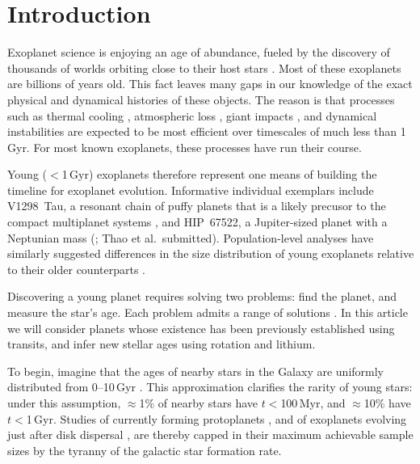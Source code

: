 \documentclass[11pt,twocolumn,tighten]{aastex63}
\begin{document}

\section{Introduction}
\label{sec:intro}

Exoplanet science is enjoying an age of abundance, fueled by the
discovery of thousands of worlds orbiting close to their host stars
\citep{Borucki10,2015JATIS...1a4003R}.  Most of these exoplanets are
billions of years old.  This fact leaves many gaps in our knowledge of
the exact physical and dynamical histories of these objects.  The
reason is that processes such as thermal cooling
\citep{2007ApJ...659.1661F}, atmospheric loss
\citep{2019AREPS..47...67O}, giant impacts
\citep{2014prpl.conf..595R}, and dynamical instabilities
\citep{2017MNRAS.470.1750I} are expected to be most efficient over
timescales of much less than 1\,Gyr.  For most known exoplanets, these
processes have run their course.

Young ($<$1\,Gyr) exoplanets therefore represent one means of building
the timeline for exoplanet evolution.  Informative individual
exemplars include V1298~Tau, a resonant chain of 
puffy planets that is a likely precusor to the compact
multiplanet systems \citep{David_2019}, and HIP~67522, a Jupiter-sized
planet with a Neptunian mass (\citealt{Rizzuto_2020}; Thao et
al.~submitted).  Population-level analyses have similarly suggested
differences in the size distribution of young exoplanets relative to
their older counterparts
\citep{Berger_2020b_rpage,David_2021,Sandoval_2021,2023AJ....166..248C,2024arXiv240303261V}.

Discovering a young planet requires solving two problems: find the
planet, and measure the star's age.  Each problem admits a range of
solutions
\citep[e.g.][]{2008Sci...322.1348M,2012ApJ...756L..33Q,2024AJ....167..193T}.
In this article we will consider planets whose existence has been
previously established using transits, and infer new stellar ages
using rotation and lithium.

To begin, imagine that the ages of nearby stars in the Galaxy are
uniformly distributed from 0--10\,Gyr
\citep[][]{2000MNRAS.318..658B,Nordstrom_2004}.  This approximation
clarifies the rarity of young stars: under this assumption,
$\approx$1\% of nearby stars have $t$$<$100\,Myr, and $\approx$10\%
have $t$$<$1\,Gyr.  Studies of currently forming protoplanets
\citep{2018A&A...617A..44K}, and of exoplanets evolving just after
disk dispersal \citep[e.g.][]{2022MNRAS.512.5067K}, are thereby capped
in their maximum achievable sample sizes by the tyranny of the
galactic star formation rate.
\end{document}
